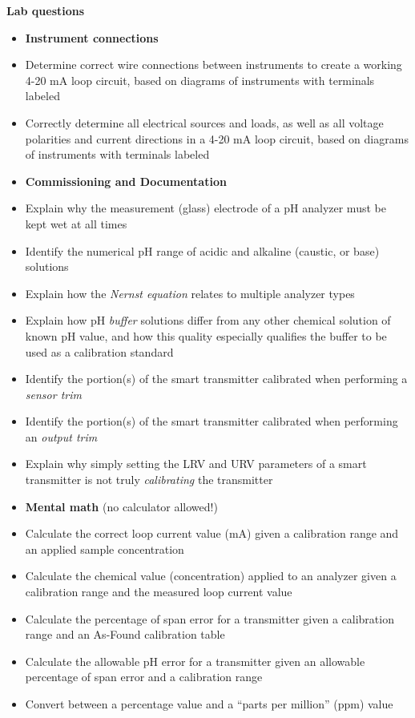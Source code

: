 \documentclass[12pt,a4paper]{article}
\begin{document}
\noindent
{\bf Lab questions}

\vskip 5pt

\begin{itemize}
\item{} {\bf Instrument connections}
\item{} Determine correct wire connections between instruments to create a working 4-20 mA loop circuit, based on diagrams of instruments with terminals labeled
\item{} Correctly determine all electrical sources and loads, as well as all voltage polarities and current directions in a 4-20 mA loop circuit, based on diagrams of instruments with terminals labeled
\end{itemize}

\filbreak

\begin{itemize}
\item{} {\bf Commissioning and Documentation}
\item{} Explain why the measurement (glass) electrode of a pH analyzer must be kept wet at all times
\item{} Identify the numerical pH range of acidic and alkaline (caustic, or base) solutions
\item{} Explain how the {\it Nernst equation} relates to multiple analyzer types
\item{} Explain how pH {\it buffer} solutions differ from any other chemical solution of known pH value, and how this quality especially qualifies the buffer to be used as a calibration standard
\item{} Identify the portion(s) of the smart transmitter calibrated when performing a {\it sensor trim}
\item{} Identify the portion(s) of the smart transmitter calibrated when performing an {\it output trim}
\item{} Explain why simply setting the LRV and URV parameters of a smart transmitter is not truly {\it calibrating} the transmitter
\end{itemize}

\filbreak

\begin{itemize}
\item{} {\bf Mental math} (no calculator allowed!)
\item{} Calculate the correct loop current value (mA) given a calibration range and an applied sample concentration 
\item{} Calculate the chemical value (concentration) applied to an analyzer given a calibration range and the measured loop current value
\item{} Calculate the percentage of span error for a transmitter given a calibration range and an As-Found calibration table 
\item{} Calculate the allowable pH error for a transmitter given an allowable percentage of span error and a calibration range
\item{} Convert between a percentage value and a ``parts per million'' (ppm) value
\end{itemize}
\end{document}
